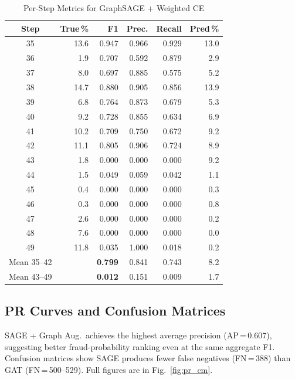 \documentclass[journal,10pt,twoside]{IEEEtran}
\begin{document}
\begin{table}[!t]
\centering
\caption{Per-Step Metrics for GraphSAGE + Weighted CE}
\label{tab:temporal_detail}
\scriptsize
\setlength{\tabcolsep}{4pt}
\begin{tabular}{crrrrr}
\toprule
\textbf{Step} & \textbf{True\,\%} & \textbf{F1}
  & \textbf{Prec.} & \textbf{Recall} & \textbf{Pred\,\%} \\
\midrule
35 & 13.6 & 0.947 & 0.966 & 0.929 & 13.0 \\
36 &  1.9 & 0.707 & 0.592 & 0.879 &  2.9 \\
37 &  8.0 & 0.697 & 0.885 & 0.575 &  5.2 \\
38 & 14.7 & 0.880 & 0.905 & 0.856 & 13.9 \\
39 &  6.8 & 0.764 & 0.873 & 0.679 &  5.3 \\
40 &  9.2 & 0.728 & 0.855 & 0.634 &  6.9 \\
41 & 10.2 & 0.709 & 0.750 & 0.672 &  9.2 \\
42 & 11.1 & 0.805 & 0.906 & 0.724 &  8.9 \\
\midrule
43 &  1.8 & 0.000 & 0.000 & 0.000 &  9.2 \\
44 &  1.5 & 0.049 & 0.059 & 0.042 &  1.1 \\
45 &  0.4 & 0.000 & 0.000 & 0.000 &  0.3 \\
46 &  0.3 & 0.000 & 0.000 & 0.000 &  0.8 \\
47 &  2.6 & 0.000 & 0.000 & 0.000 &  0.2 \\
48 &  7.6 & 0.000 & 0.000 & 0.000 &  0.0 \\
49 & 11.8 & 0.035 & 1.000 & 0.018 &  0.2 \\
\midrule
Mean 35--42 & & \textbf{0.799} & 0.841 & 0.743 & 8.2 \\
Mean 43--49 & & \textbf{0.012} & 0.151 & 0.009 & 1.7 \\
\bottomrule
\end{tabular}
\end{table}

\subsection{PR Curves and Confusion Matrices}

SAGE + Graph Aug.\ achieves the highest average precision (AP\,=\,0.607),
suggesting better fraud-probability ranking even at the same aggregate F1.
Confusion matrices show SAGE produces fewer false negatives
(FN\,=\,388) than GAT (FN\,=\,500--529). Full figures are in
Fig.~\ref{fig:pr_cm}.
\end{document}
